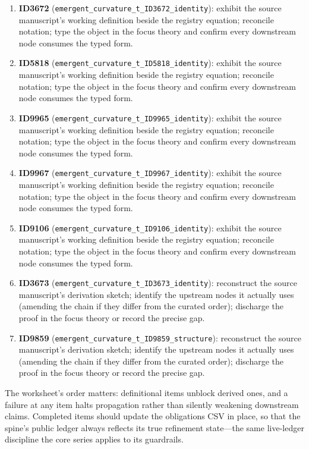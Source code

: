 \documentclass[11pt]{article}
\theoremstyle{remark}
\begin{document}
\begin{enumerate}
\item \textbf{ID3672} (\texttt{emergent\_curvature\_t\_ID3672\_identity}): exhibit the source manuscript's working definition beside the registry equation; reconcile notation; type the object in the focus theory and confirm every downstream node consumes the typed form.
\item \textbf{ID5818} (\texttt{emergent\_curvature\_t\_ID5818\_identity}): exhibit the source manuscript's working definition beside the registry equation; reconcile notation; type the object in the focus theory and confirm every downstream node consumes the typed form.
\item \textbf{ID9965} (\texttt{emergent\_curvature\_t\_ID9965\_identity}): exhibit the source manuscript's working definition beside the registry equation; reconcile notation; type the object in the focus theory and confirm every downstream node consumes the typed form.
\item \textbf{ID9967} (\texttt{emergent\_curvature\_t\_ID9967\_identity}): exhibit the source manuscript's working definition beside the registry equation; reconcile notation; type the object in the focus theory and confirm every downstream node consumes the typed form.
\item \textbf{ID9106} (\texttt{emergent\_curvature\_t\_ID9106\_identity}): exhibit the source manuscript's working definition beside the registry equation; reconcile notation; type the object in the focus theory and confirm every downstream node consumes the typed form.
\item \textbf{ID3673} (\texttt{emergent\_curvature\_t\_ID3673\_identity}): reconstruct the source manuscript's derivation sketch; identify the upstream nodes it actually uses (amending the chain if they differ from the curated order); discharge the proof in the focus theory or record the precise gap.
\item \textbf{ID9859} (\texttt{emergent\_curvature\_t\_ID9859\_structure}): reconstruct the source manuscript's derivation sketch; identify the upstream nodes it actually uses (amending the chain if they differ from the curated order); discharge the proof in the focus theory or record the precise gap.
\end{enumerate}

The worksheet's order matters: definitional items unblock derived ones, and a failure at any item halts propagation rather than silently weakening downstream claims. Completed items should update the obligations CSV in place, so that the spine's public ledger always reflects its true refinement state---the same live-ledger discipline the core series applies to its guardrails.
\end{document}
